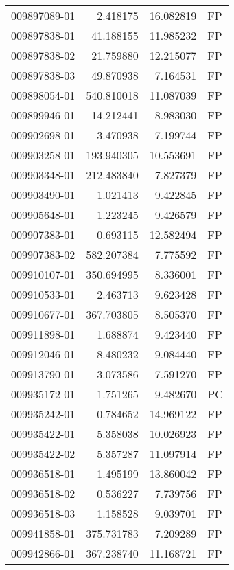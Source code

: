 \begin{tabular}{lrrl}
009897089-01 &    2.418175 &      16.082819 &   FP \\
009897838-01 &   41.188155 &      11.985232 &   FP \\
009897838-02 &   21.759880 &      12.215077 &   FP \\
009897838-03 &   49.870938 &       7.164531 &   FP \\
009898054-01 &  540.810018 &      11.087039 &   FP \\
009899946-01 &   14.212441 &       8.983030 &   FP \\
009902698-01 &    3.470938 &       7.199744 &   FP \\
009903258-01 &  193.940305 &      10.553691 &   FP \\
009903348-01 &  212.483840 &       7.827379 &   FP \\
009903490-01 &    1.021413 &       9.422845 &   FP \\
009905648-01 &    1.223245 &       9.426579 &   FP \\
009907383-01 &    0.693115 &      12.582494 &   FP \\
009907383-02 &  582.207384 &       7.775592 &   FP \\
009910107-01 &  350.694995 &       8.336001 &   FP \\
009910533-01 &    2.463713 &       9.623428 &   FP \\
009910677-01 &  367.703805 &       8.505370 &   FP \\
009911898-01 &    1.688874 &       9.423440 &   FP \\
009912046-01 &    8.480232 &       9.084440 &   FP \\
009913790-01 &    3.073586 &       7.591270 &   FP \\
009935172-01 &    1.751265 &       9.482670 &   PC \\
009935242-01 &    0.784652 &      14.969122 &   FP \\
009935422-01 &    5.358038 &      10.026923 &   FP \\
009935422-02 &    5.357287 &      11.097914 &   FP \\
009936518-01 &    1.495199 &      13.860042 &   FP \\
009936518-02 &    0.536227 &       7.739756 &   FP \\
009936518-03 &    1.158528 &       9.039701 &   FP \\
009941858-01 &  375.731783 &       7.209289 &   FP \\
009942866-01 &  367.238740 &      11.168721 &   FP \\

\end{tabular}
